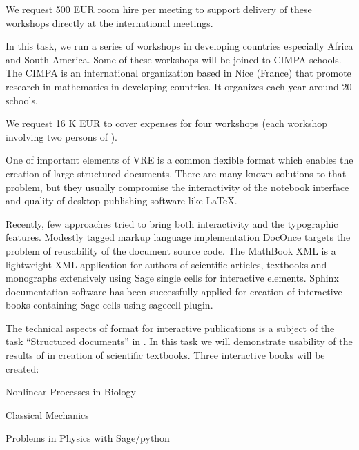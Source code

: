 \begin{workpackage}[id=dissem,wphases=18-48!.5,
  title=Dissemination and Community Building,
  lead=PS,
  PSRM=10, %
  SARM=18,
  USORM=10,
  USHRM=8,
  USRM=24,
  UVRM=2,
  UBRM=4,
]
\begin{tasklist}
\begin{task}[title=\OOMMFNB{} open source dissemination workshops,
id=dissemination-of-oommf-nb-workshops,lead=USO,PM=6]
  We request 500 EUR room hire per meeting to support delivery of
  these workshops directly at the international meetings.
\end{task}

\begin{task}[title=workshops in developing countries]
In this task, we run a series of workshops in developing countries especially
Africa and South America. Some of these workshops will be joined to CIMPA schools.
The CIMPA is an international organization based in Nice (France) that promote
research in mathematics in developing countries. It organizes each year around
20 schools.

We request 16 K EUR to cover expenses for four workshops (each workshop involving
two persons of \TheProject).

\end{task}

\begin{task}[title=Demonstrator: interactive books,
id=ibook]

One of important elements of VRE is a common flexible format which
enables the creation of large structured documents. There are many
known solutions to that problem, but they usually compromise the
interactivity of the notebook interface and quality of desktop
publishing software like LaTeX. 

Recently, few approaches tried to bring both interactivity and the
typographic features. Modestly tagged markup language implementation
DocOnce targets the problem of reusability of the document source
code. The MathBook XML is a lightweight XML application for authors of
scientific articles, textbooks and monographs extensively using Sage
single cells for interactive elements. Sphinx documentation software
has been successfully applied for creation of interactive books
containing Sage cells using sagecell plugin. 

The technical aspects of format for interactive publications is a
subject of the task ``Structured documents'' in
. In this task we will demonstrate usability
of the results of  in creation of scientific
textbooks. Three interactive books will be created:

\begin{compactitem}
\item Nonlinear Processes in Biology 
\item Classical Mechanics  
\item Problems  in Physics with Sage/python    
\end{compactitem}


\end{task}
\end{tasklist}
\end{workpackage}

